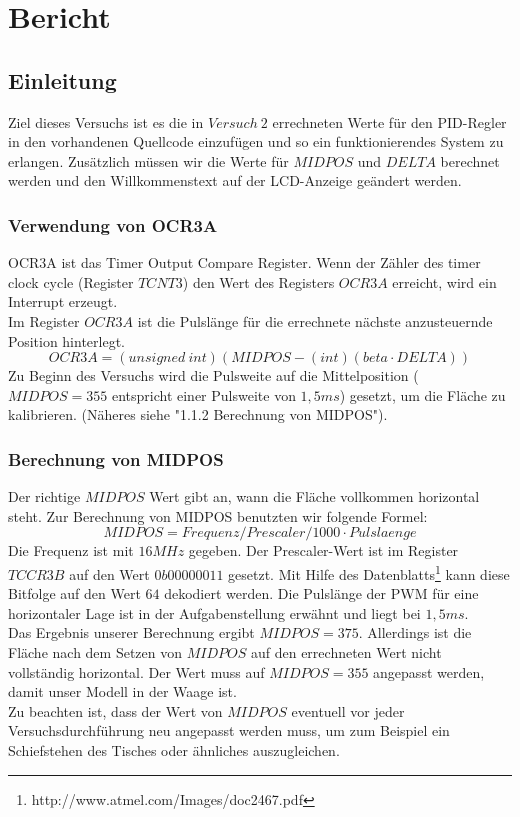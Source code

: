 \section{Bericht}

\subsection{Einleitung}
Ziel dieses Versuchs ist es die in $Versuch\ 2$ errechneten Werte für den PID-Regler in den vorhandenen Quellcode einzufügen und so ein funktionierendes System zu erlangen. Zusätzlich müssen wir die Werte für $MIDPOS$ und $DELTA$ berechnet werden und den Willkommenstext auf der LCD-Anzeige geändert werden. 

\subsubsection{Verwendung von OCR3A}
OCR3A ist das Timer Output Compare Register. Wenn der Zähler des timer clock cycle (Register $TCNT3$) den Wert des Registers $OCR3A$ erreicht, wird ein Interrupt erzeugt. \\
Im Register $OCR3A$ ist die Pulslänge für die errechnete nächste anzusteuernde Position hinterlegt.\\
\begin{equation}
OCR3A = (unsigned\ int) (MIDPOS - (int)(beta \cdot DELTA))
\end{equation}
Zu Beginn des Versuchs wird die Pulsweite auf die Mittelposition ($MIDPOS=355$ entspricht einer Pulsweite von $1,5ms$) gesetzt, um die Fläche zu kalibrieren. (Näheres siehe "1.1.2 Berechnung von MIDPOS").

\subsubsection{Berechnung von MIDPOS}
Der richtige $MIDPOS$ Wert gibt an, wann die Fläche vollkommen horizontal steht. Zur Berechnung von MIDPOS benutzten wir folgende Formel: \\
\begin{equation}
MIDPOS  = Frequenz / Prescaler / 1000 \cdot Pulslaenge
\end{equation}
Die Frequenz ist mit $16 MHz$ gegeben. Der Prescaler-Wert ist im Register $TCCR3B$ auf den Wert $0b00000011$ gesetzt. Mit Hilfe des Datenblatts\footnote{http://www.atmel.com/Images/doc2467.pdf} kann diese Bitfolge auf den Wert $64$ dekodiert werden. Die Pulslänge der PWM für eine horizontaler Lage ist in der Aufgabenstellung erwähnt und liegt bei $1,5 ms$.\\
Das Ergebnis unserer Berechnung ergibt $MIDPOS = 375$. Allerdings ist die Fläche nach dem Setzen von $MIDPOS$ auf den errechneten Wert nicht vollständig horizontal. Der Wert muss auf $MIDPOS = 355$ angepasst werden, damit unser Modell in der Waage ist. \\ 
Zu beachten ist, dass der Wert von $MIDPOS$ eventuell vor jeder Versuchsdurchführung neu angepasst werden muss, um zum Beispiel ein Schiefstehen des Tisches oder ähnliches auszugleichen.

